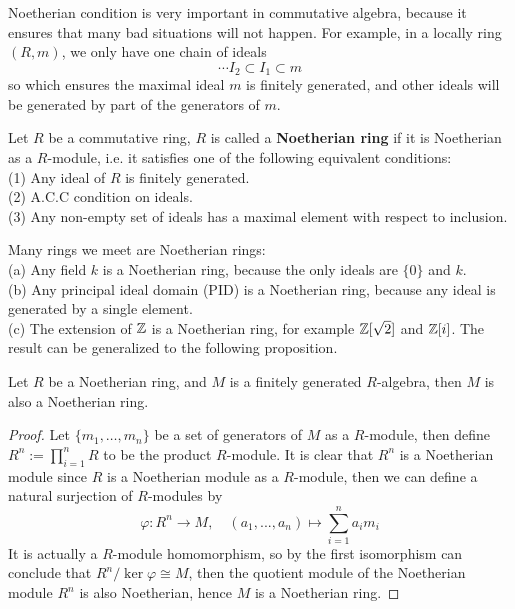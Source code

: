 \documentclass[12pt,a4paper]{article}
\begin{document}
Noetherian condition is very important in commutative algebra, because it ensures that many bad situations will not happen. For example, in a locally ring \((R,m)\), we only have one chain of ideals 
\[\cdots I_2 \subset I_1 \subset m\]
so which ensures the maximal ideal \(m\) is finitely generated, and other ideals will be generated by part of the generators of \(m\).

\begin{definition}
    Let \(R\) be a commutative ring, \(R\) is called a \textbf{Noetherian ring} if it is Noetherian as a \(R\)-module, i.e. it satisfies one of the following equivalent conditions:\\
    (1) Any ideal of \(R\) is finitely generated.\\
    (2) A.C.C condition on ideals.\\
    (3) Any non-empty set of ideals has a maximal element with respect to inclusion.
\end{definition}
\begin{remark}
    Many rings we meet are Noetherian rings:\\

    (a) Any field \(k\) is a Noetherian ring, because the only ideals are \(\{0\}\) and \(k\).\\

    (b) Any principal ideal domain (PID) is a Noetherian ring, because any ideal is generated by a single element.\\

    (c) The extension of \(\mathbb{Z}\) is a Noetherian ring, for example 
    \(\mathbb{Z}[\sqrt{2}]\) and \(\mathbb{Z}[i]\). The result can be generalized to the following proposition.\\
\end{remark}

\begin{proposition}
    Let \(R\) be a Noetherian ring, and \(M\) is a finitely generated \(R\)-algebra, then \(M\) is also a Noetherian ring.
\end{proposition}
\begin{proof}
    Let \(\{m_1,\dots ,m_n\}\) be a set of generators of \(M\) as a \(R\)-module, then define  \(R^n := \prod_{i=1}^n R\) to be the product \(R\)-module. It is clear that \(R^n\) is a Noetherian module since \(R\) is a Noetherian module as a \(R\)-module, then we can define a natural surjection of \(R\)-modules by
    \[\varphi: R^n \to M, \quad (a_1,...,a_n) \mapsto \sum_{i=1}^{n} a_i m_i\]
    It is actually a \(R\)-module homomorphism, so by the first isomorphism can conclude that \(R^n/\ker \varphi \cong M\), then the quotient module of the Noetherian module \(R^n\) is also Noetherian, hence \(M\) is a Noetherian ring.
\end{proof}
\end{document}
